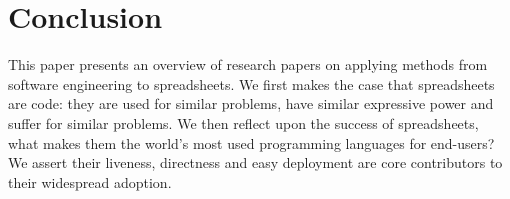 \documentclass[conference]{IEEEtran}
\begin{document}
\section{Conclusion}
This paper presents an overview of research papers on applying methods from software engineering to spreadsheets. We first makes the case that spreadsheets are code: they are used for similar problems, have similar expressive power and suffer for similar problems. We then reflect upon the success of spreadsheets, what makes them the world's most used programming languages for end-users? We assert their liveness, directness and easy deployment are core contributors to their widespread adoption. 












\end{document}
